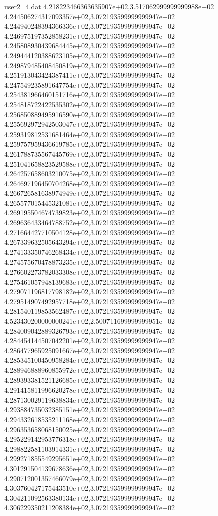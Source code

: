 \begin{filecontents}{user2_4.dat}
4.218223466363635907e+02,3.517062999999999988e+02
4.244506274317093357e+02,3.072193599999999947e+02
4.244940248394366336e+02,3.072193599999999947e+02
4.246975197352858231e+02,3.072193599999999947e+02
4.245808930439684445e+02,3.072193599999999947e+02
4.249444120388623105e+02,3.072193599999999947e+02
4.249879485408450819e+02,3.072193599999999947e+02
4.251913043424387411e+02,3.072193599999999947e+02
4.247549235891647754e+02,3.072193599999999947e+02
4.254381966460151716e+02,3.072193599999999947e+02
4.254818722422535302e+02,3.072193599999999947e+02
4.256850889495916590e+02,3.072193599999999947e+02
4.255692972942503047e+02,3.072193599999999947e+02
4.259319812531681464e+02,3.072193599999999947e+02
4.259757959436619785e+02,3.072193599999999947e+02
4.261788735567445769e+02,3.072193599999999947e+02
4.251041658823529588e+02,3.072193599999999947e+02
4.264257658603210075e+02,3.072193599999999947e+02
4.264697196450704268e+02,3.072193599999999947e+02
4.266726581638974949e+02,3.072193599999999947e+02
4.265577015445321081e+02,3.072193599999999947e+02
4.269195504674739823e+02,3.072193599999999947e+02
4.269636433464788752e+02,3.072193599999999947e+02
4.271664427710504128e+02,3.072193599999999947e+02
4.267339632505643294e+02,3.072193599999999947e+02
4.274133350746268434e+02,3.072193599999999947e+02
4.274575670478873235e+02,3.072193599999999947e+02
4.276602273782033308e+02,3.072193599999999947e+02
4.275461057948139683e+02,3.072193599999999947e+02
4.279071196817798182e+02,3.072193599999999947e+02
4.279514907492957718e+02,3.072193599999999947e+02
4.281540119853562487e+02,3.072193599999999947e+02
4.523430200000000241e+02,2.500711699999999951e+02
4.284009042889326793e+02,3.072193599999999947e+02
4.284454144507042201e+02,3.072193599999999947e+02
4.286477965925091667e+02,3.072193599999999947e+02
4.285345100450958284e+02,3.072193599999999947e+02
4.288946888960855972e+02,3.072193599999999947e+02
4.289393381521126685e+02,3.072193599999999947e+02
4.291415811996620278e+02,3.072193599999999947e+02
4.287130029119638834e+02,3.072193599999999947e+02
4.293884735032385151e+02,3.072193599999999947e+02
4.294332618535211168e+02,3.072193599999999947e+02
4.296353658068150025e+02,3.072193599999999947e+02
4.295229142953776318e+02,3.072193599999999947e+02
4.298822581103914331e+02,3.072193599999999947e+02
4.299271855549295651e+02,3.072193599999999947e+02
4.301291504139678636e+02,3.072193599999999947e+02
4.290712001357466079e+02,3.072193599999999947e+02
4.303760427175443510e+02,3.072193599999999947e+02
4.304211092563380134e+02,3.072193599999999947e+02
4.306229350211208384e+02,3.072193599999999947e+02

\end{filecontents}
